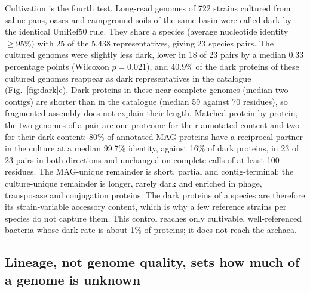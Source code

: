 \documentclass[11pt]{article}
\begin{document}
Cultivation is the fourth test. Long-read genomes of 722 strains cultured from saline pans, oases
and campground soils of the same basin were called dark by the identical UniRef50 rule. They share a
species (average nucleotide identity $\geq 95\%$) with 25 of the 5{,}438 representatives, giving 23
species pairs. The cultured genomes were slightly less dark, lower in 18 of 23 pairs by a median
$0.33$ percentage points (Wilcoxon $p = 0.021$), and 40.9\% of the dark proteins of these cultured
genomes reappear as dark representatives in the catalogue (Fig.~\ref{fig:dark}e). Dark proteins in
these near-complete genomes (median two contigs) are shorter than in the catalogue (median 59 against
70 residues), so fragmented assembly does not explain their length. Matched protein by protein, the
two genomes of a pair are one proteome for their annotated content and two for their dark content:
80\% of annotated MAG proteins have a reciprocal partner in the culture at a median 99.7\% identity,
against 16\% of dark proteins, in 23 of 23 pairs in both directions and unchanged on complete calls
of at least 100 residues. The MAG-unique remainder is short, partial and contig-terminal; the
culture-unique remainder is longer, rarely dark and enriched in phage, transposase and conjugation
proteins. The dark proteins of a species are therefore its strain-variable accessory content, which
is why a few reference strains per species do not capture them. This control reaches only cultivable, well-referenced
bacteria whose dark rate is about 1\% of proteins; it does not reach the archaea.

\subsection*{Lineage, not genome quality, sets how much of a genome is unknown}
\end{document}
